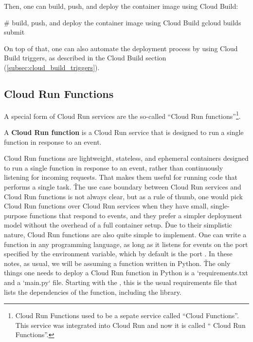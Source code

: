 Then, one can build, push, and deploy the container image using Cloud Build:
\begin{bash}
# build, push, and deploy the container image using Cloud Build
gcloud builds submit
\end{bash}

On top of that, one can also automate the deployment process by using Cloud Build triggers, as described in the
Cloud Build section (\ref{subsec:cloud_build_triggers}).

\subsection{Cloud Run Functions}

A special form of Cloud Run services are the so-called ``Cloud Run functions''\footnote{Cloud Run Functions used to be
a sepate service called ``Cloud Functions''. This service was integrated into Cloud Run and now it is called `` Cloud
Run Functions''.}.

A \textbf{Cloud Run function} is a Cloud Run service that is designed to run a single function in response to an event.
\ed

Cloud Run functions are lightweight, stateless, and ephemeral containers designed to run a single function in response
to an event, rather than continuously listening for incoming requests. That makes them useful for running code that
performs a single task. \v

The use case boundary between Cloud Run services and Cloud Run functions is not always clear, but as a rule of
thumb, one would pick Cloud Run functions over Cloud Run services when they have small, single-purpose functions
that respond to events, and they prefer a simpler deployment model without the overhead of a full container setup. \v

Due to their simplistic nature, Cloud Run functions are also quite simple to implement. One can write a function in
any programming language, as long as it listens for events on the port specified by the  environment
variable, which by default is the port . In these notes, as usual, we will be assuming a function written in
Python. \v

The only things one needs to deploy a Cloud Run function in Python is a `requirements.txt and a `main.py` file. \v

Starting with the , this is the usual requirements file that lists the dependencies of the
function, including the  library.

